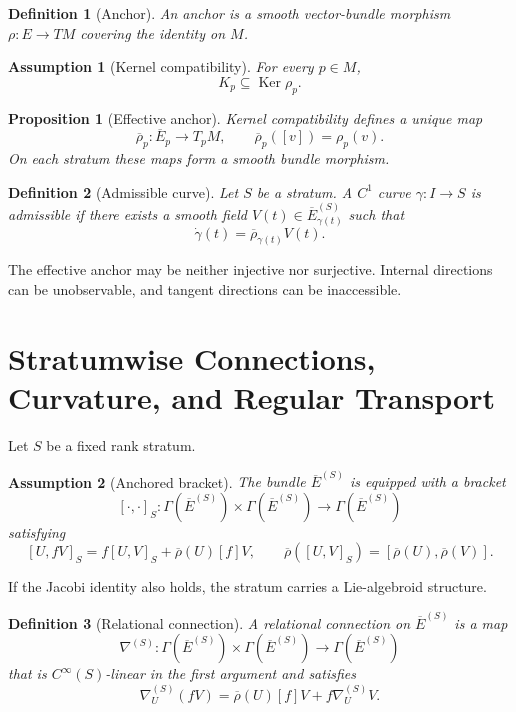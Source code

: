 \documentclass[11pt]{article}
\newtheorem{definition}{Definition}[section]
\newtheorem{assumption}{Assumption}[section]
\newtheorem{proposition}{Proposition}[section]
\newcommand{\Ker}{\operatorname{Ker}}
\begin{document}
\begin{definition}[Anchor]
An anchor is a smooth vector-bundle morphism $\rho:E\to TM$ covering the
identity on $M$.
\end{definition}

\begin{assumption}[Kernel compatibility]
For every $p\in M$,
\[
K_p\subseteq\Ker\rho_p.
\]
\end{assumption}

\begin{proposition}[Effective anchor]
Kernel compatibility defines a unique map
\[
\overline\rho_p:\overline E_p\to T_pM,
\qquad \overline\rho_p([v])=\rho_p(v).
\]
On each stratum these maps form a smooth bundle morphism.
\end{proposition}

\begin{definition}[Admissible curve]
Let $S$ be a stratum. A $C^1$ curve $\gamma:I\to S$ is admissible if there
exists a smooth field $V(t)\in\overline E^{(S)}_{\gamma(t)}$ such that
\[
\dot\gamma(t)=\overline\rho_{\gamma(t)}V(t).
\]
\end{definition}

The effective anchor may be neither injective nor surjective. Internal
directions can be unobservable, and tangent directions can be inaccessible.

\section{Stratumwise Connections, Curvature, and Regular Transport}
\label{sec:connection}

Let $S$ be a fixed rank stratum.

\begin{assumption}[Anchored bracket]
The bundle $\overline E^{(S)}$ is equipped with a bracket
\[
[\cdot,\cdot]_S:\Gamma(\overline E^{(S)})\times
\Gamma(\overline E^{(S)})\to\Gamma(\overline E^{(S)})
\]
satisfying
\[
[U,fV]_S=f[U,V]_S+\overline\rho(U)[f]V,
\qquad
\overline\rho([U,V]_S)=[\overline\rho(U),\overline\rho(V)].
\]
\end{assumption}

If the Jacobi identity also holds, the stratum carries a Lie-algebroid
structure.

\begin{definition}[Relational connection]
A relational connection on $\overline E^{(S)}$ is a map
\[
\nabla^{(S)}:\Gamma(\overline E^{(S)})\times
\Gamma(\overline E^{(S)})\to\Gamma(\overline E^{(S)})
\]
that is $C^\infty(S)$-linear in the first argument and satisfies
\[
\nabla^{(S)}_U(fV)=\overline\rho(U)[f]V+f\nabla^{(S)}_UV.
\]
\end{definition}
\end{document}
